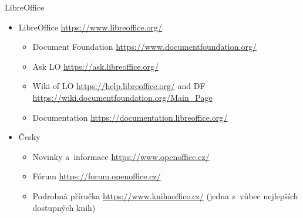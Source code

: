 \documentclass[compress, ucs, xelatex, 11pt, xcolor=svgnames, aspectratio=169,
	hyperref={
		bookmarks=true,
		unicode=true,
		colorlinks=true,
		pdftitle={Linux, command line and MetaCentrum},
		plainpages=false,
		pdfauthor={Vojtech Zeisek},
		pdfsubject={Course about use of Linux command line, writing shell scripts and using MetaCentrum of CESNET},
		pdfcreator={XeLaTeX},
		pdfkeywords={Linux, GNU, BASH, shell, command line, MetaCentrum},
		linkcolor=DarkRed, %
		anchorcolor=DarkBlue, %
		citecolor=Indigo, %
		filecolor=NavyBlue, %
		menucolor=DarkMagenta, %
		urlcolor=DarkBlue, %
		pdftex},
	url={hyphens, lowtilde} %
	]{beamer}
\begin{document}
\begin{frame}{LibreOffice}
	\begin{itemize}
		\item LibreOffice \url{https://www.libreoffice.org/}
		\begin{itemize}
			\item Document Foundation \url{https://www.documentfoundation.org/}
			\item Ask LO \url{https://ask.libreoffice.org/}
			\item Wiki of LO \url{https://help.libreoffice.org/} and DF \url{https://wiki.documentfoundation.org/Main_Page}
			\item Documentation \url{https://documentation.libreoffice.org/}
		\end{itemize}
		\item Česky
		\begin{itemize}
			\item Novinky a~informace \url{https://www.openoffice.cz/}
			\item Fórum \url{https://forum.openoffice.cz/}
			\item Podrobná příručka \url{https://www.knihaoffice.cz/} (jedna z~vůbec nejlepších dostupných knih)
		\end{itemize}
	\end{itemize}
\end{frame}
\end{document}
